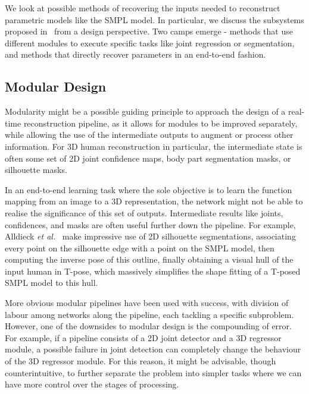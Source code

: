 \documentclass[9pt,twocolumn]{article}
\begin{document}
	\par{We look at possible methods of recovering the inputs needed to reconstruct parametric models
	like the SMPL model. In particular, we discuss the subsystems proposed in~\cite{smplify,hmr,humanshape,nbf,avatars}
	from a design perspective. Two camps emerge - methods that use different modules to execute specific tasks like
	joint regression or segmentation, and methods that directly recover parameters in an end-to-end fashion.

	\subsection{Modular Design}
	
		\par{Modularity might be a possible guiding principle to approach the design of a real-time reconstruction
		pipeline, as it allows for modules to be improved separately, while allowing the use of the intermediate
		outputs to augment or process other information. For 3D human reconstruction in particular, the intermediate
		state is often some set of 2D joint confidence maps, body part segmentation masks, or silhouette masks.}\\

		\par{In an end-to-end learning task where the sole objective is to learn the function mapping from an image
		to a 3D representation, the network might not be able to realise the significance of this set of outputs.
		Intermediate results like joints, confidences, and masks are often useful further down the pipeline. For example,
		Alldieck \textit{et al.}~\cite{avatars} make impressive use of 2D silhouette segmentations, associating
		every point on the silhouette edge with a point on the SMPL model, then computing the inverse pose of this
		outline, finally obtaining a visual hull of the input human in T-pose, which massively simplifies the shape
		fitting of a T-posed SMPL model to this hull.}\\

		\par{More obvious modular pipelines have been used with success, with division of labour among networks along
		the pipeline, each tackling a specific subproblem.
		However, one of the downsides to modular design is the compounding of error. For example, if a pipeline
		consists of a 2D joint detector and a 3D regressor module, a possible failure in joint detection can completely
		change the behaviour of the 3D regressor module. For this reason, it might be advisable, though counterintuitive,
		to further separate the problem into simpler tasks where we can have more control over the stages of processing.}

}
\end{document}
